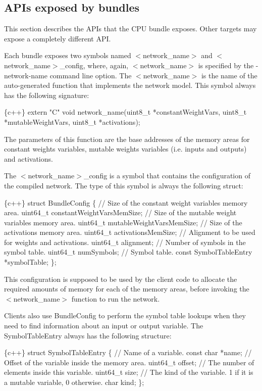 \subsection*{A\+P\+Is exposed by bundles}

This section describes the A\+P\+Is that the C\+PU bundle exposes. Other targets may expose a completely different A\+PI.

Each bundle exposes two symbols named {\ttfamily $<$network\+\_\+name$>$} and {\ttfamily $<$network\+\_\+name$>$\+\_\+config}, where, again, {\ttfamily $<$network\+\_\+name$>$} is specified by the {\ttfamily -\/network-\/name} command line option. The {\ttfamily $<$network\+\_\+name$>$} is the name of the auto-\/generated function that implements the network model. This symbol always has the following signature\+:


\begin{DoxyCode}
\{c++\}
extern "C" void network\_name(uint8\_t *constantWeightVars,
                             uint8\_t *mutableWeightVars,
                             uint8\_t *activations);
\end{DoxyCode}
 The parameters of this function are the base addresses of the memory areas for constant weights variables, mutable weights variables (i.\+e. inputs and outputs) and activations.

The {\ttfamily $<$network\+\_\+name$>$\+\_\+config} is a symbol that contains the configuration of the compiled network. The type of this symbol is always the following struct\+: 
\begin{DoxyCode}
\{c++\}
struct BundleConfig \{
  // Size of the constant weight variables memory area.
  uint64\_t constantWeightVarsMemSize;
  // Size of the mutable weight variables memory area.
  uint64\_t mutableWeightVarsMemSize;
  // Size of the activations memory area.
  uint64\_t activationsMemSize;
  // Alignment to be used for weights and activations.
  uint64\_t alignment;
  // Number of symbols in the symbol table.
  uint64\_t numSymbols;
  // Symbol table.
  const SymbolTableEntry *symbolTable;
\};
\end{DoxyCode}
 This configuration is supposed to be used by the client code to allocate the required amounts of memory for each of the memory areas, before invoking the {\ttfamily $<$network\+\_\+name$>$} function to run the network.

Clients also use {\ttfamily Bundle\+Config} to perform the symbol table lookups when they need to find information about an input or output variable. The Symbol\+Table\+Entry always has the following structure\+: 
\begin{DoxyCode}
\{c++\}
struct SymbolTableEntry \{
  // Name of a variable.
  const char *name;
  // Offset of the variable inside the memory area.
  uint64\_t offset;
  // The number of elements inside this variable.
  uint64\_t size;
  // The kind of the variable. 1 if it is a mutable variable, 0 otherwise.
  char kind;
\};
\end{DoxyCode}


